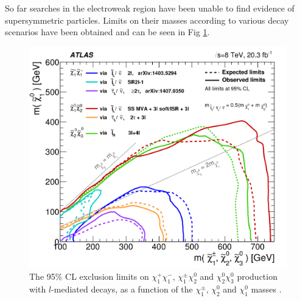 So far searches in the electroweak region have been unable to find evidence of supersymmetric particles. Limits on their masses according to various decay scenarios have been obtained and can be seen in Fig \ref{fig:summaryplot}.
\begin{figure}[!ht]
	\centering
	\captionsetup{width=0.8\textwidth}
	\includegraphics[scale=0.15]{Chap3/fig_19b}
	\caption[Exlcusion limits on electroweak production at ATLAS]{The 95\% CL exclusion limits on $\chi_1^+\chi_1^-$, $\chi_1^{\pm}\chi_2^0$ and $\chi_2^0\chi_3^0$ production with $l$-mediated decays, as a function of the $\chi_1^{\pm},\,\chi_2^0$ and $\chi_1^0$ masses \citep{aad2016search}. }\label{fig:summaryplot}
\end{figure}


